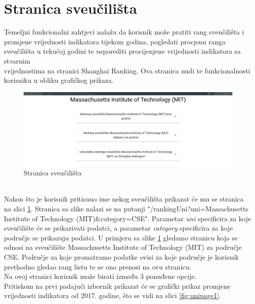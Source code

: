 \documentclass[times, utf8, zavrsni]{fer}
\begin{document}
\section{Stranica sveučilišta}
\label{section:unipagesection}
Temeljni funkcionalni zahtjevi nalažu da korisnik može pratiti rang sveučilišta i promjene vrijednosti indikatora tijekom godina, pogledati procjenu 
ranga sveučilišta u tekućoj godini te usporediti procijenjene vrijednosti indikatora sa stvarnim \\vrijednostima na stranici Shanghai Ranking. Ova stranica 
nudi te funkcionalnosti korisniku u obliku grafičkog prikaza. 
\\
\begin{figure}[htb]
    \hspace*{-2cm}  
       \includegraphics[scale=0.21]{unipage.png} 
       \caption{Stranica sveučilišta}
       \label{fig:unipage}
       \end{figure}
\\Nakon što je korisnik pritisnuo ime nekog sveučilišta prikazat će mu se stranica na slici \ref{fig:unipage}. Stranica sa slike nalazi se na putanji 
"/rankingUni?uni=Massachusetts Institute of Technology (MIT)\&category=CSE". Parametar \emph{uni} specificira za koje sveučilište će se prikazivati podatci, a 
parametar \emph{category} specificira za koje područje se prikazuju podatci. U primjeru sa slike \ref{fig:unipage} gledamo stranicu koja se odnosi na sveučilište 
Massachusetts Institute of Technology (MIT) za područje CSE. Područje za koje promatramo podatke ovisi za koje područje je korisnik prethodno gledao 
rang listu te se ono prenosi na ovu stranicu. 
\\Na ovoj stranici korisnik može birati između 3 ponuđene opcije. 
\\Pritiskom na prvi padajući izbornik prikazat će se grafički prikaz promjene vrijednosti indikatora
od 2017. godine, što se vidi na slici \ref{fig:unipage1}. 
\end{document}

